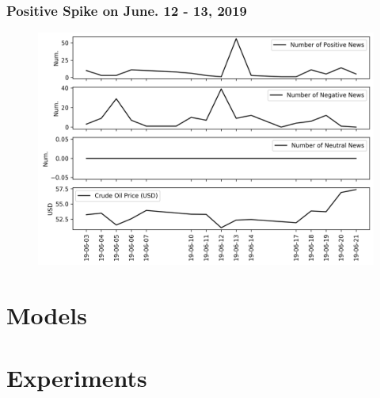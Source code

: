 \documentclass[12pt]{article}
\begin{document}
	\subsubsection{Positive Spike on June. 12 - 13, 2019}
	\begin{figure}[H]
		\centering
		\small
		\includegraphics[width=\linewidth]{figures/case_studies/20190612_10d.png}
		\caption{}
	\end{figure}
	\section{Models}
	
	\section{Experiments}

	
	
	
\end{document}
